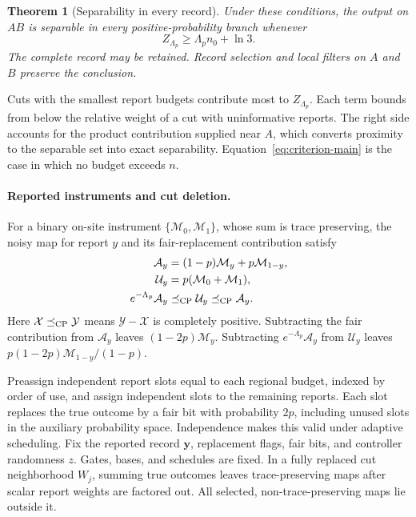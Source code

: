 \documentclass[aps,prl,twocolumn,superscriptaddress,longbibliography,reprint,floatfix]{revtex4-2}
\newtheorem{theorem}{Theorem}
\begin{document}
\begin{theorem}[Separability in every record]
\label{thm:range}
Under these conditions, the output on $AB$ is separable in every
positive-probability branch whenever
\begin{equation}
 Z_{\Lambda_p}\ge\Lambda_p n_0+\ln3.
 \label{eq:cut-range}
\end{equation}
The complete record may be retained. Record selection and local
filters on $A$ and $B$ preserve the conclusion.
\end{theorem}
Cuts with the smallest report budgets contribute most to $Z_{\Lambda_p}$. Each term bounds from below the relative weight of a cut with
uninformative reports. The right side accounts for the product
contribution supplied near $A$, which converts proximity to the
separable set into exact separability. Equation~\eqref{eq:criterion-main}
is the case in which no budget exceeds $n$.

\smallskip
\paragraph*{Reported instruments and cut deletion.}
For a binary on-site instrument $\{\mathcal M_0,\mathcal M_1\}$, whose
sum is trace preserving, the noisy map for report $y$ and its
fair-replacement contribution satisfy
\begin{equation}
 \begin{aligned}
 \mathcal A_y&=(1-p)\mathcal M_y+p\mathcal M_{1-y},\\
 \mathcal U_y&=p(\mathcal M_0+\mathcal M_1),\\
 e^{-\Lambda_p}\mathcal A_y&\preceq_{\rm CP}\mathcal U_y
       \preceq_{\rm CP}\mathcal A_y.
 \end{aligned}
 \label{eq:local-order}
\end{equation}
Here $\mathcal X\preceq_{\rm CP}\mathcal Y$ means
$\mathcal Y-\mathcal X$ is completely positive. Subtracting the fair
contribution from $\mathcal A_y$ leaves $(1-2p)\mathcal M_y$.
Subtracting $e^{-\Lambda_p}\mathcal A_y$ from $\mathcal U_y$ leaves
$p(1-2p)\mathcal M_{1-y}/(1-p)$.

Preassign independent report slots equal to each regional budget,
indexed by order of use, and assign independent slots to the remaining
reports. Each slot replaces the true outcome by a fair bit with
probability $2p$, including unused slots in the auxiliary probability
space. Independence makes this valid under adaptive scheduling.
Fix the reported record $\boldsymbol y$, replacement flags, fair bits, and controller
randomness $z$. Gates, bases, and schedules are fixed.
In a fully replaced cut neighborhood $W_j$,
summing true outcomes leaves trace-preserving maps after scalar report
weights are factored out. All selected,
non-trace-preserving maps lie outside it.
\end{document}
